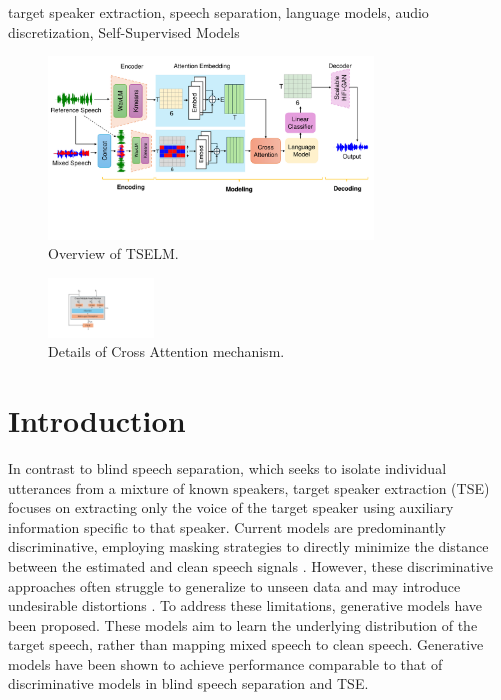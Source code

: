 \documentclass[conference]{IEEEtran}
\begin{document}
\begin{IEEEkeywords}
target speaker extraction, speech separation, language models, audio discretization, Self-Supervised Models
\end{IEEEkeywords}
\begin{figure}[t]
    \centering
    \includegraphics[width=0.77\textwidth]{assets/model.pdf}
    \caption{Overview of TSELM.}
    \label{model}
    \end{figure}

    \begin{figure}
        \centering
        \includegraphics[width=0.25\textwidth]{assets/cross_attention.pdf}
        \caption{Details of Cross Attention mechanism.}
        \label{cross_attention}
        \end{figure}


        
\section{Introduction}

In contrast to blind speech separation, which seeks to isolate individual utterances from a mixture of known speakers, target speaker extraction (TSE) focuses on extracting only the voice of the target speaker using auxiliary information specific to that speaker. Current models are predominantly discriminative, employing masking strategies to directly minimize the distance between the estimated and clean speech signals \cite{luo2019conv,spex_plus,sepformer,sef_net}. However, these discriminative approaches often struggle to generalize to unseen data and may introduce undesirable distortions \cite{distortion}. To address these limitations, generative models have been proposed. These models aim to learn the underlying distribution of the target speech, rather than mapping mixed speech to clean speech. Generative models have been shown to achieve performance comparable to that of discriminative models \cite{target_diff,tokensplit} in blind speech separation and TSE.
\end{document}
